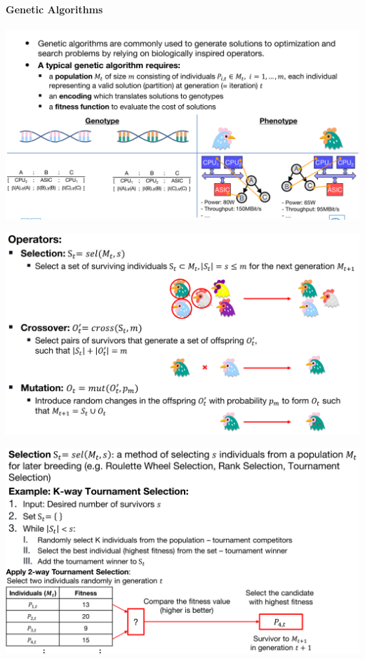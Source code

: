 \documentclass[english]{latex4ei/latex4ei_sheet}
\begin{document}
\paragraph{Genetic Algorithms}

\begin{center}
  \centering
  \includegraphics[width=\linewidth]{assets/GeneticAlgortihm.png}
  \label{fig:geneticalgortihm}
\end{center}

\begin{center}
  \centering
  \includegraphics[width=0.8\linewidth]{assets/GeneticOperators.png}
  \label{fig:geneticoperators}
\end{center}

\begin{center}
  \centering
  \includegraphics[width=0.8\linewidth]{assets/GeneticSelection.png}
  \label{fig:geneticselection}
\end{center}
\end{document}
